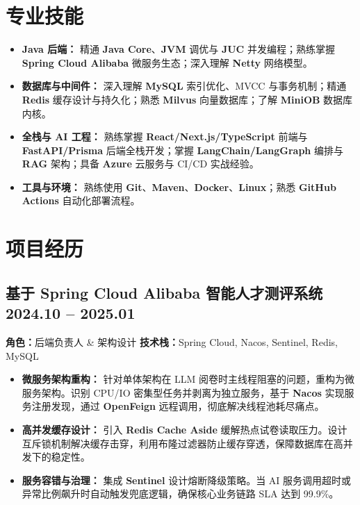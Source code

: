 \documentclass[10pt]{article}
\begin{document}
\section{\texorpdfstring{\makebox[\widthof{\faWrench}][c]{\color{NPU_Blue}{\normalfont\faWrench}}\quad 专业技能}{专业技能}}
\begin{itemize}
    \item \textbf{Java 后端：} 精通 \textbf{Java Core}、\textbf{JVM} 调优与 \textbf{JUC} 并发编程；熟练掌握 \textbf{Spring Cloud Alibaba} 微服务生态；深入理解 \textbf{Netty} 网络模型。
    \item \textbf{数据库与中间件：} 深入理解 \textbf{MySQL} 索引优化、MVCC 与事务机制；精通 \textbf{Redis} 缓存设计与持久化；熟悉 \textbf{Milvus} 向量数据库；了解 \textbf{MiniOB} 数据库内核。
    \item \textbf{全栈与 AI 工程：} 熟练掌握 \textbf{React/Next.js/TypeScript} 前端与 \textbf{FastAPI/Prisma} 后端全栈开发；掌握 \textbf{LangChain/LangGraph} 编排与 \textbf{RAG} 架构；具备 \textbf{Azure} 云服务与 CI/CD 实战经验。
    \item \textbf{工具与环境：} 熟练使用 \textbf{Git}、\textbf{Maven}、\textbf{Docker}、\textbf{Linux}；熟悉 \textbf{GitHub Actions} 自动化部署流程。
\end{itemize}

\section{\texorpdfstring{\makebox[\widthof{\faLaptop}][c]{\color{NPU_Blue}{\normalfont\faLaptop}}\quad 项目经历}{项目经历}}

\subsection{\texorpdfstring{基于 Spring Cloud Alibaba 智能人才测评系统 \hfill \rm{\small 2024.10 -- 2025.01}}{基于 Spring Cloud Alibaba 智能人才测评系统}}
\vspace{0.1em}
\small{\textbf{角色：}后端负责人 \& 架构设计 \quad \textbf{技术栈：}Spring Cloud, Nacos, Sentinel, Redis, MySQL}
\vspace{0.2em}
\begin{itemize}
    \item \textbf{微服务架构重构：} 针对单体架构在 LLM 阅卷时主线程阻塞的问题，重构为微服务架构。识别 CPU/IO 密集型任务并剥离为独立服务，基于 \textbf{Nacos} 实现服务注册发现，通过 \textbf{OpenFeign} 远程调用，彻底解决线程池耗尽痛点。
    \item \textbf{高并发缓存设计：} 引入 \textbf{Redis Cache Aside} 缓解热点试卷读取压力。设计互斥锁机制解决缓存击穿，利用布隆过滤器防止缓存穿透，保障数据库在高并发下的稳定性。
    \item \textbf{服务容错与治理：} 集成 \textbf{Sentinel} 设计熔断降级策略。当 AI 服务调用超时或异常比例飙升时自动触发兜底逻辑，确保核心业务链路 SLA 达到 99.9\%。
\end{itemize}
\end{document}
